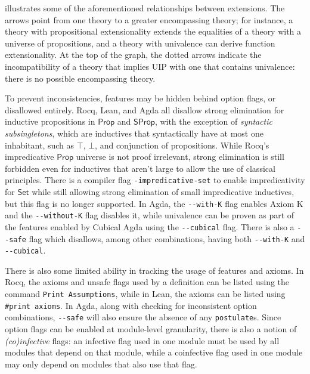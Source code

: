\documentclass{article}
\newcommand{\kw}[1]{\mathsf{#1}}
\newcommand{\code}[1]{\texttt{#1}}
\begin{document}
 illustrates some of the aforementioned relationships between extensions.
The arrows point from one theory to a greater encompassing theory;
for instance, a theory with propositional extensionality extends the equalities
of a theory with a universe of propositions,
and a theory with univalence can derive function extensionality.
At the top of the graph, the dotted arrows indicate
the incompatibility of a theory that implies UIP with one that contains univalence:
there is no possible encompassing theory.

To prevent inconsistencies, features may be hidden behind option flags,
or disallowed entirely.
Rocq, Lean, and Agda all disallow strong elimination for inductive propositions
in $\kw{Prop}$ and $\kw{SProp}$,
with the exception of \emph{syntactic subsingletons},
which are inductives that syntactically have at most one inhabitant,
such as $\top$, $\bot$, and conjunction of propositions.
While Rocq's impredicative $\kw{Prop}$ universe is not proof irrelevant,
strong elimination is still forbidden even for inductives that aren't large
to allow the use of classical principles.
There is a compiler flag \code{-impredicative-set}
to enable impredicativity for $\kw{Set}$
while still allowing strong elimination of small impredicative inductives,
but this flag is no longer supported.
In Agda, the \code{-{}-with-K} flag enables Axiom K
and the \code{-{}-without-K} flag disables it,
while univalence can be proven as part of the features enabled by Cubical Agda
using the \code{-{}-cubical} flag.
There is also a \code{-{}-safe} flag which disallows,
among other combinations,
having both \code{-{}-with-K} and \code{-{}-cubical}.

There is also some limited ability in tracking the usage of features and axioms.
In Rocq, the axioms and unsafe flags used by a definition
can be listed using the command \code{Print Assumptions},
while in Lean, the axioms can be listed using \code{\#print axioms}.
In Agda, along with checking for inconsistent option combinations,
\code{-{}-safe} will also ensure the absence of any \code{postulate}s.
Since option flags can be enabled at module-level granularity,
there is also a notion of \emph{(co)infective} flags:
an infective flag used in one module
must be used by all modules that depend on that module,
while a coinfective flag used in one module
may only depend on modules that also use that flag.
\end{document}
